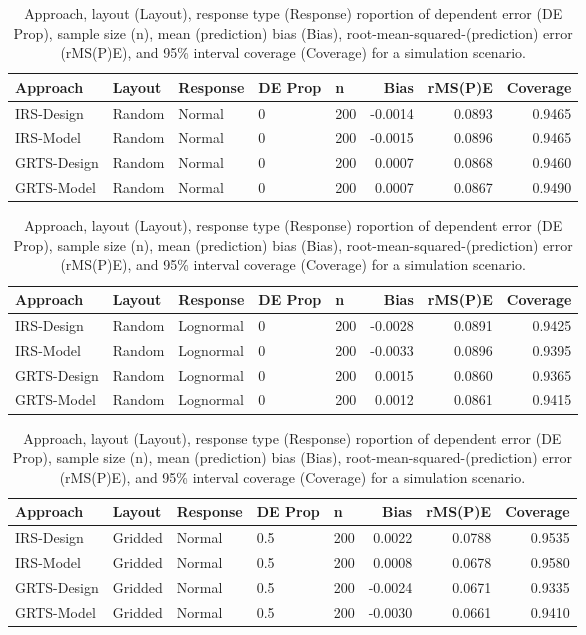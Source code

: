 \documentclass[]{elsarticle} %
\begin{document}
\begin{table}[ht]
\centering
\begin{tabular}{lllllrrr}
  \hline
Approach & Layout & Response & DE Prop & n & Bias & rMS(P)E & Coverage \\ 
  \hline
IRS-Design & Random & Normal & 0 & 200 & -0.0014 & 0.0893 & 0.9465 \\ 
  IRS-Model & Random & Normal & 0 & 200 & -0.0015 & 0.0896 & 0.9465 \\ 
  GRTS-Design & Random & Normal & 0 & 200 & 0.0007 & 0.0868 & 0.9460 \\ 
  GRTS-Model & Random & Normal & 0 & 200 & 0.0007 & 0.0867 & 0.9490 \\ 
   \hline
\end{tabular}
\caption{Approach, layout (Layout), response type (Response) roportion of dependent error (DE Prop), sample size (n), mean (prediction) bias (Bias), root-mean-squared-(prediction) error (rMS(P)E), and 95\% interval coverage (Coverage) for a simulation scenario.} 
\end{table}
\begin{table}[ht]
\centering
\begin{tabular}{lllllrrr}
  \hline
Approach & Layout & Response & DE Prop & n & Bias & rMS(P)E & Coverage \\ 
  \hline
IRS-Design & Random & Lognormal & 0 & 200 & -0.0028 & 0.0891 & 0.9425 \\ 
  IRS-Model & Random & Lognormal & 0 & 200 & -0.0033 & 0.0896 & 0.9395 \\ 
  GRTS-Design & Random & Lognormal & 0 & 200 & 0.0015 & 0.0860 & 0.9365 \\ 
  GRTS-Model & Random & Lognormal & 0 & 200 & 0.0012 & 0.0861 & 0.9415 \\ 
   \hline
\end{tabular}
\caption{Approach, layout (Layout), response type (Response) roportion of dependent error (DE Prop), sample size (n), mean (prediction) bias (Bias), root-mean-squared-(prediction) error (rMS(P)E), and 95\% interval coverage (Coverage) for a simulation scenario.} 
\end{table}
\begin{table}[ht]
\centering
\begin{tabular}{lllllrrr}
  \hline
Approach & Layout & Response & DE Prop & n & Bias & rMS(P)E & Coverage \\ 
  \hline
IRS-Design & Gridded & Normal & 0.5 & 200 & 0.0022 & 0.0788 & 0.9535 \\ 
  IRS-Model & Gridded & Normal & 0.5 & 200 & 0.0008 & 0.0678 & 0.9580 \\ 
  GRTS-Design & Gridded & Normal & 0.5 & 200 & -0.0024 & 0.0671 & 0.9335 \\ 
  GRTS-Model & Gridded & Normal & 0.5 & 200 & -0.0030 & 0.0661 & 0.9410 \\ 
   \hline
\end{tabular}
\caption{Approach, layout (Layout), response type (Response) roportion of dependent error (DE Prop), sample size (n), mean (prediction) bias (Bias), root-mean-squared-(prediction) error (rMS(P)E), and 95\% interval coverage (Coverage) for a simulation scenario.} 
\end{table}
\end{document}
